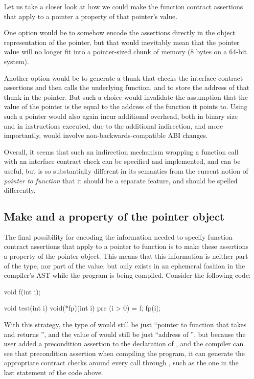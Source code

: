 Let us take a closer look at how we could make the function contract assertions that apply to a pointer a property of that pointer's value.

One option would be to somehow encode the assertions directly in the object representation of the pointer, but that would inevitably mean that the pointer value will no longer fit into a pointer-sized chunk of memory (8 bytes on a 64-bit system).

Another option would be to generate a thunk that checks the interface contract assertions and then calls the underlying function, and to store the address of that thunk in the pointer. But such a choice would invalidate the assumption that the value of the pointer is the equal to the address of the function it points to. Using such a pointer would also again incur additional overhead, both in binary size and in instructions executed, due to the additional indirection, and more importantly, would involve non-backwards-compatible ABI changes.

Overall, it seems that such an indirection mechanism wrapping a function call with an interface contract check can be specified and implemented, and can be useful, but is so substantially different in its semantics from the current notion of \emph{pointer to function} that it should be a separate feature, and should be spelled differently.

\subsection{Make  and  a property of the pointer object}

The final possibility for encoding the information needed to specify function contract assertions that apply to a pointer to function is to make these assertions a property of the pointer object. This means that this information is neither part of the type, nor part of the value, but only exists in an ephemeral fashion in the compiler's AST while the program is being compiled. Consider the following code:

\pagebreak %

\begin{codeblock}
void f(int i);

void test(int i) {
  void(*fp)(int i) pre (i > 0) = f;
  fp(i);
}
\end{codeblock}
With this strategy, the type of  would still be just ``pointer to function that takes  and returns '', and the value of  would still be just ``address of '', but because the user added a precondition assertion to the declaration of , and the compiler can see that precondition assertion when compiling the program, it can generate the appropriate contract checks around every call through , such as the one in the last statement of the code above.

